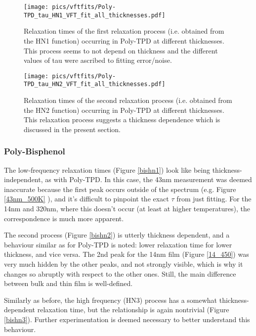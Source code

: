 \begin{figure}[!htb]%
  \centering
  \texttt{[image: pics/vftfits/Poly-TPD\_tau\_HN1\_VFT\_fit\_all\_thicknesses.pdf]}
  \caption{Relaxation times of the first relaxation process (i.e. obtained from the HN1 function) occurring in Poly-TPD at different thicknesses. This process seems to not depend on thickness and the different values of tau were ascribed to fitting error/noise.}
  \label{tpdhn1}
\end{figure}%

\begin{figure}[!htb]%
  \centering
  \texttt{[image: pics/vftfits/Poly-TPD\_tau\_HN2\_VFT\_fit\_all\_thicknesses.pdf]}
  \caption{Relaxation times of the second relaxation process (i.e. obtained from the HN2 function) occurring in Poly-TPD at different thicknesses. This relaxation process suggests a thickness dependence which is discussed in the present section.}
  \label{tpdhn2}
\end{figure}%

\newpage

\subsubsection{Poly-Bisphenol}
The low-frequency relaxation times (Figure \ref{bishn1}) look like being thickness-independent, as with Poly-TPD. In this case, the 43nm measurement was deemed inaccurate because the first peak occurs outside of the spectrum (e.g. Figure \ref{43nm_500K} %
), and it's difficult to pinpoint the exact $\tau$ from just fitting.
For the 14nm and 320nm, where this doesn't occur (at least at higher temperatures), the correspondence is much more apparent.

The second process (Figure \ref{bishn2}) is utterly thickness dependent, and a behaviour similar as for Poly-TPD is noted: lower relaxation time for lower thickness, and vice versa. The 2nd peak for the 14nm film (Figure \ref{14_450}) was very much hidden by the other peaks, and not strongly visible, which is why it changes so abruptly with respect to the other ones. Still, the main difference between bulk and thin film is well-defined.

Similarly as before, the high frequency (HN3) process has a somewhat thickness-dependent relaxation time, but the relationship is again nontrivial (Figure \ref{bishn3}). Further experimentation is deemed necessary to better understand this behaviour.

